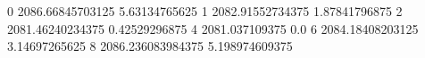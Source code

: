0 2086.66845703125 5.63134765625
1 2082.91552734375 1.87841796875
2 2081.46240234375 0.42529296875
4 2081.037109375 0.0
6 2084.18408203125 3.14697265625
8 2086.236083984375 5.198974609375
